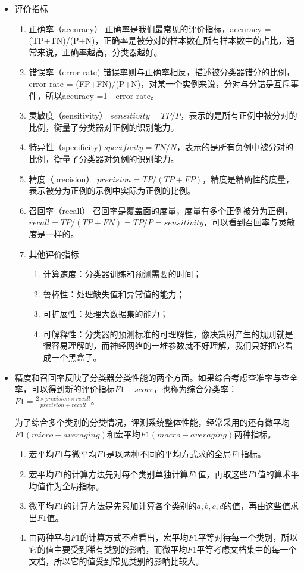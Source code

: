 \begin{itemize}
\item 评价指标
	\begin{enumerate}
			\itemsep0em
		\item 正确率（accuracy） 正确率是我们最常见的评价指标，accuracy = (TP+TN)/(P+N)，正确率是被分对的样本数在所有样本数中的占比，通常来说，正确率越高，分类器越好。
		\item 错误率（error rate) 错误率则与正确率相反，描述被分类器错分的比例，error rate = (FP+FN)/(P+N)，对某一个实例来说，分对与分错是互斥事件，所以accuracy =1 -  error rate。
		\item 灵敏度（sensitivity） $sensitivity = TP/P$，表示的是所有正例中被分对的比例，衡量了分类器对正例的识别能力。
		\item 特异性（specificity) $specificity = TN/N$，表示的是所有负例中被分对的比例，衡量了分类器对负例的识别能力。
		\item 精度（precision） $precision=TP/(TP+FP)$，精度是精确性的度量，表示被分为正例的示例中实际为正例的比例。
		\item 召回率（recall） 召回率是覆盖面的度量，度量有多个正例被分为正例，$recall=TP/(TP+FN)=TP/P=sensitivity$，可以看到召回率与灵敏度是一样的。
		\item 其他评价指标
			\begin{enumerate}
					\itemsep0em
				\item 计算速度：分类器训练和预测需要的时间；
				\item 鲁棒性：处理缺失值和异常值的能力；
				\item 可扩展性：处理大数据集的能力；
				\item 可解释性：分类器的预测标准的可理解性，像决策树产生的规则就是很容易理解的，而神经网络的一堆参数就不好理解，我们只好把它看成一个黑盒子。
			\end{enumerate}
	\end{enumerate}

\item 精度和召回率反映了分类器分类性能的两个方面。如果综合考虑查准率与查全率，可以得到新的评价指标$F1-score$，也称为综合分类率：$F1=\frac{2 \times precision \times recall}{precision + recall}$。

		为了综合多个类别的分类情况，评测系统整体性能，经常采用的还有微平均$F1(micro-averaging)$和宏平均$F1(macro-averaging)$两种指标。

		\begin{enumerate}
			\itemsep0em
			\item 宏平均$F1$与微平均$F1$是以两种不同的平均方式求的全局$F1$指标。
			\item 宏平均$F1$的计算方法先对每个类别单独计算$F1$值，再取这些$F1$值的算术平均值作为全局指标。
			\item 微平均$F1$的计算方法是先累加计算各个类别的$a,b,c,d$的值，再由这些值求出$F1$值。
			\item 由两种平均$F1$的计算方式不难看出，宏平均$F1$平等对待每一个类别，所以它的值主要受到稀有类别的影响，而微平均$F1$平等考虑文档集中的每一个文档，所以它的值受到常见类别的影响比较大。
		\end{enumerate}


\end{itemize}
